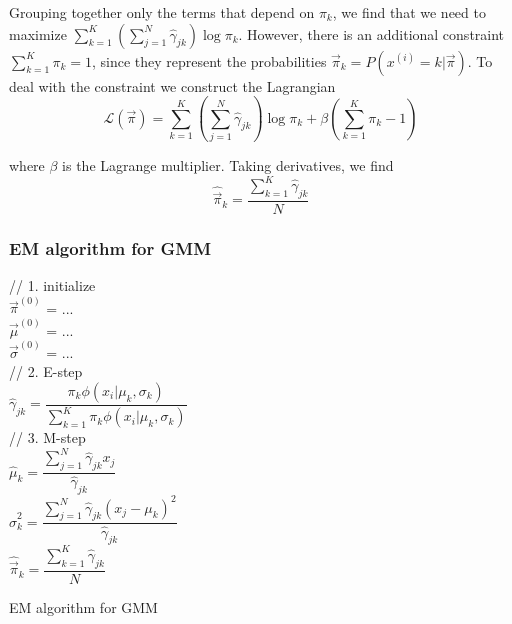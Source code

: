 Grouping together only the terms that depend on $\pi_k$, we find that we need to maximize $\sum\limits_{k=1}^K{\left(\sum\limits_{j=1}^N{\hat{\gamma}_{jk}}\right)\log\pi_k}$. However, there is an additional constraint $\sum\limits_{k=1}^K{\pi_k}=1$, since they represent the probabilities $\vec{\pi}_k=P(x^{(i)}=k|\vec{\pi})$. To deal with the constraint we construct the Lagrangian
\begin{equation}
\mathcal{L}(\vec{\pi})=\sum\limits_{k=1}^K{\left(\sum\limits_{j=1}^N{\hat{\gamma}_{jk}}\right)\log\pi_k}+\beta\left(\sum\limits_{k=1}^K{\pi_k}-1\right) \nonumber
\end{equation}

where $\beta$ is the Lagrange multiplier. Taking derivatives, we find
\begin{equation}
\hat{\vec{\pi}}_k=\dfrac{\sum\limits_{k=1}^K{\hat{\gamma}_{jk}}}{N}
\end{equation}


\subsubsection{EM algorithm for GMM}

\begin{algorithm}[htbp]
    \SetAlgoNoLine

	// 1. initialize \\
	$\vec{\pi}^{(0)}$ = ... \\
	$\vec{\mu}^{(0)}$ = ...  \\
	$\vec{\sigma}^{(0)}$ = ...  \\
	
	 {
	    // 2. E-step \\
	    $\hat{\gamma}_{jk}=\dfrac{\pi_k\phi(x_i|\mu_k,\sigma_k)}{\sum\limits_{k=1}^K{\pi_k\phi(x_i|\mu_k,\sigma_k)}}$ \\
	    // 3. M-step \\
		$\hat{\mu}_k = \dfrac{\sum\limits_{j=1}^N{\hat{\gamma}_{jk}x_j}}{\hat{\gamma}_{jk}}$ \\
		$\hat{\sigma}_k^2 = \dfrac{\sum\limits_{j=1}^N{\hat{\gamma}_{jk}\left(x_j-\mu_k\right)^2}}{\hat{\gamma}_{jk}}$ \\
		$\hat{\vec{\pi}}_k=\dfrac{\sum\limits_{k=1}^K{\hat{\gamma}_{jk}}}{N}$ \\
	}
	
\caption{EM algorithm for GMM}
\end{algorithm}


